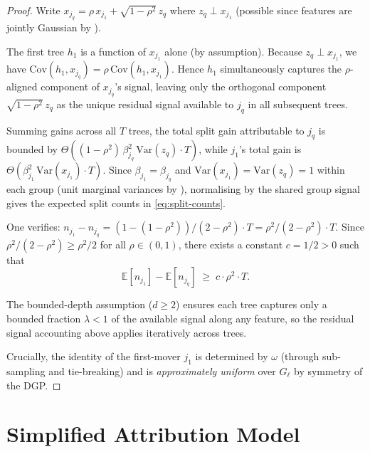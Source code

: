 \documentclass[11pt]{article}
\theoremstyle{remark}
\newcommand{\Gl}{G_\ell}                    %
\newcommand{\splits}[1]{n_{#1}}             %
\newcommand{\totalT}{T}                     %
\newcommand{\rhovar}{\rho}                  %
\newcommand{\Exp}{\mathbb{E}}              %
\newcommand{\Var}{\mathrm{Var}}            %
\begin{document}
\begin{proof}
Write $x_{j_q} = \rhovar\, x_{j_1} + \sqrt{1-\rhovar^2}\, z_q$
where $z_q \perp x_{j_1}$ (possible since features are jointly Gaussian
by ).

The first tree $h_1$ is a function of $x_{j_1}$ alone (by assumption).
Because $z_q \perp x_{j_1}$, we have
$\mathrm{Cov}(h_1, x_{j_q}) = \rho\,\mathrm{Cov}(h_1, x_{j_1})$.
Hence $h_1$ simultaneously captures the $\rho$-aligned component of
$x_{j_q}$'s signal, leaving only the orthogonal component
$\sqrt{1-\rho^2}\,z_q$ as the unique residual signal available to $j_q$
in all subsequent trees.

Summing gains across all $T$ trees, the total split gain attributable to
$j_q$ is bounded by $\Theta((1-\rho^2)\,\beta_{j_q}^2\,\Var(z_q)\cdot T)$,
while $j_1$'s total gain is $\Theta(\beta_{j_1}^2\,\Var(x_{j_1})\cdot T)$.
Since $\beta_{j_1} = \beta_{j_q}$ and $\Var(x_{j_1}) = \Var(z_q) = 1$
within each group (unit marginal variances by ), normalising
by the shared group signal gives the expected split counts in
\eqref{eq:split-counts}.

One verifies: $n_{j_1} - n_{j_q} = (1 - (1-\rho^2))/(2-\rho^2) \cdot T = \rho^2/(2-\rho^2) \cdot T$.
Since $\rho^2/(2-\rho^2) \geq \rho^2/2$ for all $\rho \in (0,1)$, there
exists a constant $c = 1/2 > 0$ such that
\begin{equation}
  \Exp[\splits{j_1}] - \Exp[\splits{j_q}]
    \;\geq\; c \cdot \rhovar^2 \cdot \totalT.
\end{equation}

The bounded-depth assumption ($d \geq 2$) ensures each tree captures only
a bounded fraction $\lambda < 1$ of the available signal along any feature,
so the residual signal accounting above applies iteratively across trees.

Crucially, the identity of the first-mover $j_1$ is determined by
$\omega$ (through sub-sampling and tie-breaking) and is
\emph{approximately uniform} over $\Gl$ by symmetry of the DGP.
\end{proof}


\section{Simplified Attribution Model}
\label{sec:attribution}
\end{document}

